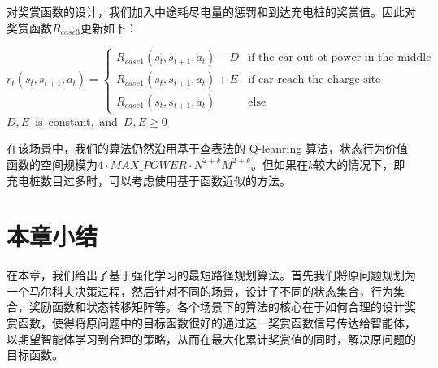 \documentclass{standalone}
\begin{document}
对奖赏函数的设计，我们加入中途耗尽电量的惩罚和到达充电桩的奖赏值。因此对奖赏函数$R_{case3}$更新如下：
\begin{center}
    \begin{equation}
    \label{eq3reward}
    r_t(s_t, s_{t+1}, a_t) = \begin{cases}
     R_{case1}(s_t, s_{t+1}, a_t) - D &\mbox{if the car out ot power in the middle}\\
     R_{case1}(s_t, s_{t+1}, a_t) + E&\mbox{if car reach the charge site}\\
     R_{case1}(s_t, s_{t+1}, a_t)&\mbox{else}
    \end{cases}
    \end{equation}
    \mbox{$D, E$ is constant, and $D, E \geq 0$}

\end{center}
在该场景中，我们的算法仍然沿用基于查表法的 Q-leanring 算法，状态行为价值函数的空间规模为$4\cdot MAX\_POWER\cdot N^{2+k}M^{2+k}$。但如果在$k$较大的情况下，即充电桩数目过多时，可以考虑使用基于函数近似的方法。
\section{本章小结}
在本章，我们给出了基于强化学习的最短路径规划算法。首先我们将原问题规划为一个马尔科夫决策过程，然后针对不同的场景，设计了不同的状态集合，行为集合，奖励函数和状态转移矩阵等。各个场景下的算法的核心在于如何合理的设计奖赏函数，使得将原问题中的目标函数很好的通过这一奖赏函数信号传达给智能体，以期望智能体学习到合理的策略，从而在最大化累计奖赏值的同时，解决原问题的目标函数。
\end{document}
